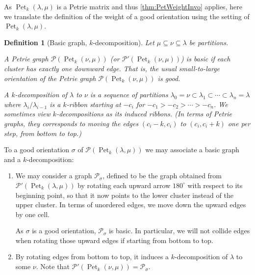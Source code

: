 \documentclass[pdflatex,sn-mathphys-num]{sn-jnl}%
\theoremstyle{thmstyleone}%
\theoremstyle{thmstyletwo}%
\theoremstyle{thmstylethree}%
\newtheorem{definition}[theorem]{Definition}
\numberwithin{equation}{section}
\DeclareMathOperator{\Pet}{Pet}
\begin{document}
    As $\Pet_k(\lambda,\mu)$ is a Petrie matrix and thus \cref{thm:PetWeightInvo} applies, here we translate the definition of the weight of a good orientation using the setting of $\Pet_k(\lambda,\mu)$.

    \begin{definition}[Basic graph, $k$-decomposition]
        Let $\mu\subseteq \nu\subseteq \lambda$ be partitions. 
        
        A Petrie graph $\mathcal{P}(\Pet_k(\nu,\mu))$ (or $\mathcal{P}'(\Pet_k(\nu,\mu))$) is  \emph{basic} if each cluster has exactly one downward edge. That is, the usual small-to-large orientation of the Petrie graph $\mathcal{P}(\Pet_k(\nu,\mu))$ is good.
		
        A \textit{$k$-decomposition} of $\lambda$ to $\nu$ is a sequence of partitions $\lambda_0=\nu \subset \lambda_1\subset \cdots\subset \lambda_n=\lambda$ where $\lambda_i/\lambda_{i-1}$ is a $k$-ribbon starting at $-c_i$ for $-c_1>-c_2>\cdots>-c_n$. We sometimes view $k$-decompositions as its induced ribbons.
        (In terms of Petrie graphs, they corresponds to moving the edges $(c_i-k,c_i)$ to $(c_i,c_i+k)$ one per step, from bottom to top.)
	\end{definition}
         To a good orientation $\sigma$ of $\mathcal{P}(\Pet_k(\lambda,\mu))$ we may associate a basic graph and a $k$-decomposition:
         \begin{enumerate}
             \item We may consider a graph $\mathcal{P}_\sigma$, defined to be the graph obtained from $\mathcal{P}'(\Pet_k(\lambda,\mu))$ by rotating each upward arrow $180^\circ$ with respect to its beginning point, so that it now points to the lower cluster instead of the upper cluster. In terms of unordered edges, we move down the upward edges by one cell.
             
             As $\sigma$ is a good orientation, $\mathcal{P}_\sigma$ is basic. In particular, we will not collide edges when rotating those upward edges if starting from bottom to top.
             \item By rotating edges from bottom to top, it induces a $k$-decomposition of $\lambda$ to some $\nu$. Note that $\mathcal{P}'(\Pet_k(\nu,\mu))=\mathcal{P}_\sigma$.
         \end{enumerate}
         
\end{document}
